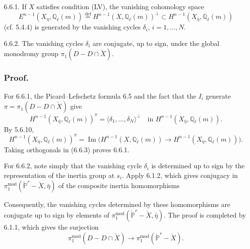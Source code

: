 \medskip
\noindent
\textup{6.6.1.} If $X$ satisfies condition (LV), the vanishing
cohomology space
\[
E^{n-1}(X_{\bar\eta},\mathbb Q_\ell(m))
\stackrel{\mathrm{def}}{=}
H^{n-1}(X,\mathbb Q_\ell(m))^\perp
\subset H^{n-1}(X_{\bar\eta},\mathbb Q_\ell(m))
\]
(cf. 5.4.4) is generated by the vanishing cycles
$\delta_i$, $i=1,\ldots,N$.

\medskip
\noindent
\textup{6.6.2.} The vanishing cycles $\delta_i$ are conjugate, up to
sign, under the global monodromy group
$\pi_1(D-D\cap\check X)$.

\subsubsection*{Proof.}
For 6.6.1, the Picard--Lefschetz formula 6.5 and the fact that the
$I_i$ generate $\pi=\pi_1(D-D\cap\check X)$ give
\begin{equation}\tag{6.6.3}
H^{n-1}(X_{\bar\eta},\mathbb Q_\ell(m))^\pi
=\bigl\langle\delta_1,\ldots,\delta_N\bigr\rangle^\perp
\quad\text{in }H^{n-1}(X_{\bar\eta},\mathbb Q_\ell(m)).
\end{equation}
By 5.6.10,
\begin{equation}\tag{6.6.4}
H^{n-1}(X_{\bar\eta},\mathbb Q_\ell(m))^\pi
=\operatorname{Im}\bigl(
H^{n-1}(X,\mathbb Q_\ell(m))
\longrightarrow H^{n-1}(X_{\bar\eta},\mathbb Q_\ell(m))
\bigr).
\end{equation}
Taking orthogonals in (6.6.3) proves 6.6.1.

For 6.6.2, note simply that the vanishing cycle $\delta_i$ is
determined up to sign by the representation of the inertia group at
$s_i$.  Apply 6.1.2, which gives conjugacy in
$\pi_1^{\mathrm{mod}}(\check{\mathbb P}^{r}-\check X,\bar\eta)$ of the
composite inertia homomorphisms
\begin{center}
\end{center}
Consequently, the vanishing cycles determined by these homomorphisms
are conjugate up to sign by elements of
$\pi_1^{\mathrm{mod}}(\check{\mathbb P}^{r}-\check X,\bar\eta)$.
The proof is completed by 6.1.1, which gives the surjection
\[
\pi_1^{\mathrm{mod}}(D-D\cap\check X)
\longrightarrow
\pi_1^{\mathrm{mod}}(\check{\mathbb P}^{r}-\check X).
\]

